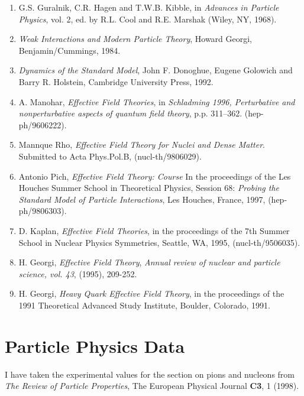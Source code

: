 \documentclass[12pt]{report}
\begin{document}
\begin{enumerate}

\item
G.S. Guralnik, C.R. Hagen and T.W.B. Kibble, in {\it
Advances in Particle Physics}, vol. 2, ed. by R.L. Cool and
R.E. Marshak (Wiley, NY, 1968).

\item
{\it Weak Interactions and Modern Particle Theory}, Howard
Georgi, Benjamin/Cummings, 1984.

\item
{\it Dynamics of the Standard Model}, John F. Donoghue,
Eugene Golowich and Barry R. Holstein, Cambridge University
Press, 1992.

\item
A. Manohar, {\sl Effective Field Theories},  in {\it
Schladming 1996, Perturbative and nonperturbative  aspects
of quantum field theory}, p.p. 311--362. (hep-ph/9606222).

\item
Mannque Rho, {\sl Effective Field Theory for Nuclei and
Dense Matter}. Submitted to Acta Phys.Pol.B,
(nucl-th/9806029).

\item
Antonio Pich, {\sl Effective Field Theory: Course} In the
proceedings of the Les Houches Summer School in Theoretical
Physics, Session 68: {\it Probing the Standard Model of
Particle Interactions}, Les Houches, France, 1997,
(hep-ph/9806303).

\item
D. Kaplan, {\sl Effective Field Theories}, in the
proceedings of the 7th Summer School in Nuclear Physics
Symmetries, Seattle, WA, 1995, (nucl-th/9506035).

\item
H. Georgi, {\sl Effective Field Theory}, {\it Annual review
of nuclear and particle science, vol. 43}, (1995), 209-252.

\item
H. Georgi, {\sl Heavy Quark Effective Field Theory}, in the
proceedings of the 1991 Theoretical Advanced Study
Institute, Boulder, Colorado, 1991. 

\end{enumerate}

\section{Particle Physics Data}

I have taken the experimental values for the section on
pions and nucleons from {\it The Review of Particle
Properties}, The European Physical Journal {\bf C3},
1 (1998).
\end{document}
